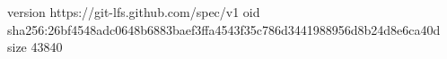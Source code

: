version https://git-lfs.github.com/spec/v1
oid sha256:26bf4548adc0648b6883baef3ffa4543f35c786d3441988956d8b24d8e6ca40d
size 43840
